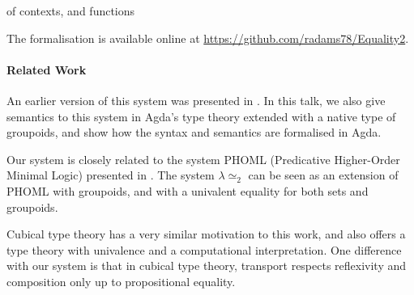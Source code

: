\documentclass{easychair}
\newcommand{\LEtwo}{\ensuremath{\lambda \! \! \simeq_2}}
\begin{document}
of contexts, and functions


The formalisation is available online at \url{https://github.com/radams78/Equality2}.

\paragraph{Related Work}

An earlier version of this system was presented in \cite{ap:tsnhu}.  In this talk, we also give semantics to this system in Agda's type theory extended with a native type of groupoids, and show how the syntax and semantics are formalised in Agda.

Our system is closely related to the system PHOML (Predicative Higher-Order Minimal Logic) presented in \cite{abc:ncrpehoml}.  The system $\LEtwo$ can be seen as an extension of PHOML with groupoids, and with a univalent equality for both sets and groupoids.

Cubical type theory \cite{cchm:cubical, huber:canonicity} has a very similar motivation to this work, and also offers a type theory with univalence and a computational interpretation.  One difference with our system is that in cubical type theory, transport respects reflexivity and composition only up to propositional equality.



\end{document}
